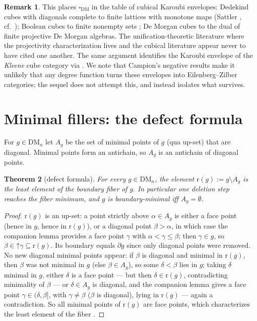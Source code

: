 \documentclass[11pt]{amsart}
\newtheorem{thm}{Theorem}[section]
\theoremstyle{definition}
\newtheorem{rem}[thm]{Remark}
\newcommand{\DM}{\mathrm{DM}}
\newcommand{\cube}{\square_{\mathrm{DM}}}
\newcommand{\bnd}{\partial}
\newcommand{\rmin}{\mathrm{r}}
\newcommand{\Up}{\mathord{\uparrow}}
\begin{document}
\begin{rem}
  This places $\cube$ in the table of cubical Karoubi envelopes:
  Dedekind cubes with diagonals complete to finite lattices with
  monotone maps (Sattler \cite{SattlerNote}, cf.\
  \cite[Prop.~8.8]{Campion}); Boolean cubes to finite nonempty sets
  \cite[Prop.~8.11]{Campion}; De Morgan cubes to the dual of finite
  projective De Morgan algebras.  The unification-theoretic
  literature where the projectivity characterization lives
  \cite{BovaCabrer} and the cubical literature appear never to have
  cited one another.  The same argument identifies the Karoubi
  envelope of the \emph{Kleene} cube category via
  \cite[Thm.~12]{BovaCabrer}.  We note that Campion's negative
  results \cite[Thm.~8.12(2)]{Campion} make it unlikely that any
  degree function turns these envelopes into Eilenberg--Zilber
  categories; the sequel does not attempt this, and instead
  isolates what survives.
\end{rem}

\section{Minimal fillers: the defect formula}
\label{sec:defect}

For $g \in \DM_n$ let $A_g$ be the set of minimal points of $g$
(qua up-set) that are diagonal.  Minimal points form an antichain,
so $A_g$ is an antichain of diagonal points.

\begin{thm}[defect formula]
  \label{thm:defect}
  For every $g \in \DM_n$, the element
  $\rmin(g) := g \setminus A_g$ is the least element of the
  boundary fiber of $g$.  In particular one deletion step reaches
  the fiber minimum, and $g$ is boundary-minimal iff
  $A_g = \emptyset$.
\end{thm}

\begin{proof}
  $\rmin(g)$ is an up-set: a point strictly above $\alpha \in A_g$
  is either a face point (hence in $g$, hence in $\rmin(g)$), or a
  diagonal point $\beta > \alpha$, in which case the companion
  lemma \cite[Lem.~2.3]{DMFibers} provides a face point $\gamma$
  with $\alpha < \gamma \leq \beta$; then $\gamma \in g$, so
  $\beta \in \Up\gamma \subseteq \rmin(g)$.  Its boundary equals
  $\bnd g$ since only diagonal points were removed.  No new
  diagonal minimal points appear: if $\beta$ is diagonal and minimal
  in $\rmin(g)$, then $\beta$ was not minimal in $g$ (else
  $\beta \in A_g$), so some $\delta < \beta$ lies in $g$; taking
  $\delta$ minimal in $g$, either $\delta$ is a face point --- but
  then $\delta \in \rmin(g)$, contradicting minimality of $\beta$
  --- or $\delta \in A_g$ is diagonal, and the companion lemma gives
  a face point $\gamma \in (\delta, \beta]$, with
  $\gamma \neq \beta$ ($\beta$ is diagonal), lying in $\rmin(g)$ ---
  again a contradiction.  So all minimal points of $\rmin(g)$ are
  face points, which characterizes the least element of the fiber
  \cite[Thm.~4.2]{DMFibers}.
\end{proof}
\end{document}
